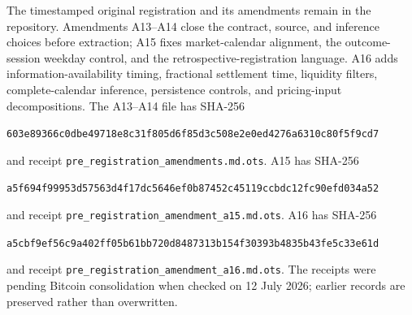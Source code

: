 \documentclass[11pt]{article}
\begin{document}
The timestamped original registration and its amendments remain in the repository.
Amendments A13--A14 close the contract, source, and inference choices before extraction;
A15 fixes market-calendar alignment, the outcome-session weekday control, and the
retrospective-registration language.  A16 adds information-availability timing, fractional
settlement time, liquidity filters, complete-calendar inference, persistence controls, and
pricing-input decompositions.  The A13--A14 file has SHA-256
\begin{center}
\small\texttt{603e89366c0dbe49718e8c31f805d6f85d3c508e2e0ed4276a6310c80f5f9cd7}
\end{center}
and receipt \texttt{pre\_registration\_amendments.md.ots}.  A15 has SHA-256
\begin{center}
\small\texttt{a5f694f99953d57563d4f17dc5646ef0b87452c45119ccbdc12fc90efd034a52}
\end{center}
and receipt \texttt{pre\_registration\_amendment\_a15.md.ots}.  A16 has SHA-256
\begin{center}
\small\texttt{a5cbf9ef56c9a402ff05b61bb720d8487313b154f30393b4835b43fe5c33e61d}
\end{center}
and receipt \texttt{pre\_registration\_amendment\_a16.md.ots}.  The receipts were pending
Bitcoin consolidation when checked on 12 July 2026; earlier records are preserved rather
than overwritten.
\end{document}
